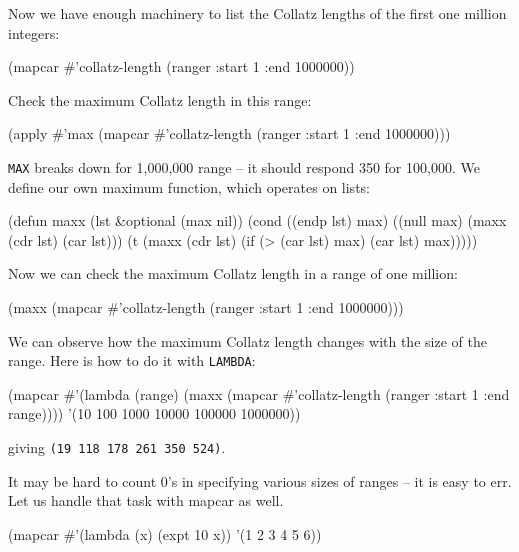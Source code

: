 \documentclass[a4paper,11pt]{article}
\begin{document}
\begin{uenum}
\item Now we have enough machinery to list the Collatz lengths of the first one million integers:

\begin{lispcode}
(mapcar #'collatz-length (ranger :start 1 :end 1000000))
\end{lispcode}

\item Check the maximum Collatz length in this range:

\begin{lispcode}
(apply #'max 
	(mapcar #'collatz-length (ranger :start 1 :end 1000000)))
\end{lispcode}

\item \Verb+MAX+ breaks down for 1,000,000 range -- it should respond 350 for 100,000. We define our own maximum function, which operates on lists:

\begin{lispcode}
(defun maxx (lst &optional (max nil))
  (cond ((endp lst) max)
		((null max) (maxx (cdr lst) (car lst)))
		(t (maxx (cdr lst) (if (> (car lst) max)
							 (car lst)
							 max)))))
\end{lispcode}

\item Now we can check the maximum Collatz length in a range of one million:

\begin{lispcode}
(maxx (mapcar #'collatz-length (ranger :start 1 :end 1000000))) 
\end{lispcode}

\item We can observe how the maximum Collatz length changes with the size of the range. Here is how to do it with \Verb+LAMBDA+: 

\begin{lispcode}
(mapcar 
	#'(lambda (range) 
		(maxx (mapcar #'collatz-length 
			(ranger :start 1 :end range)))) 
	'(10 100 1000 10000 100000 1000000))
\end{lispcode}
giving \Verb+(19 118 178 261 350 524)+.

\item It may be hard to count 0's in specifying various sizes of ranges -- it is easy to err. Let us handle that task with mapcar as well.

\begin{lispcode}
(mapcar #'(lambda (x) (expt 10 x)) '(1 2 3 4 5 6))
\end{lispcode}


\end{uenum}
\end{document}
